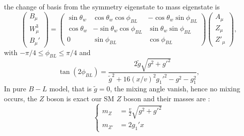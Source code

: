 \documentclass{report}
\numberwithin{equation}{section}
\begin{document}
the change of basis from the symmetry eigenstate to mass eigenstate is 
\begin{equation}
\begin{pmatrix}
B_\mu\\ W_\mu^3\\ B_\mu'
\end{pmatrix}=\begin{pmatrix}
\sin \theta_w & \cos \theta_w \cos \phi_{BL} & -\cos\theta_w  \sin\phi_{BL}\\
\cos \theta_w & -\sin \theta_w \cos \phi_{BL} & \sin\theta_w  \sin\phi_{BL}\\
0& \sin\phi_{BL}& \cos\phi_{BL}
\end{pmatrix}\begin{pmatrix}
A_\mu\\ Z_\mu\\Z'_\mu
\end{pmatrix}\label{transformmatrix},
\end{equation}
with $-\pi/4 \leqslant \phi_{BL} \leqslant \pi/4$ and 
\begin{equation}
\tan(2\phi_{BL})=\frac{2\tilde{g}\sqrt{g^2+g'^2}}{\tilde{g}^2 +16 (x/v)^2 g_1'^2-g^2-g_1^2},\label{mixingangle}
\end{equation}
In pure $B-L$ model, that is $\tilde{g}=0$, the mixing angle vanish, hence no mixing occurs, the $Z$ boson is exact our SM $Z$ boson and their masses are :
\begin{equation}
\begin{cases}
m_Z&=\frac{v}{2}\sqrt{g^2+g'^2}\\
m_{Z'}&=2 g_1' x
\end{cases}
\end{equation}
\end{document}
